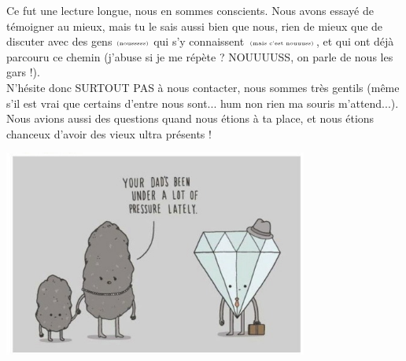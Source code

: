 Ce fut une lecture longue, nous en sommes conscients. Nous avons essayé de témoigner au mieux, mais tu le sais aussi bien que nous, rien de mieux que de discuter avec des gens $\tiny\text{(nousssss)}$ qui s'y connaissent $\tiny\text{(mais c'est nouuuss)}$, et qui ont déjà parcouru ce chemin {\tiny (j'abuse si je me répète ? NOUUUUSS, on parle de nous les gars !)}.\\
N'hésite donc SURTOUT PAS à nous contacter, nous sommes très gentils (même s'il est vrai que certains d'entre nous sont... hum non rien ma souris m'attend...). Nous avions aussi des questions quand nous étions à ta place, et nous étions chanceux d'avoir des vieux ultra présents !\\

\vspace{2cm}

\centering
\includegraphics[width=10cm]{meme pression.jpeg}